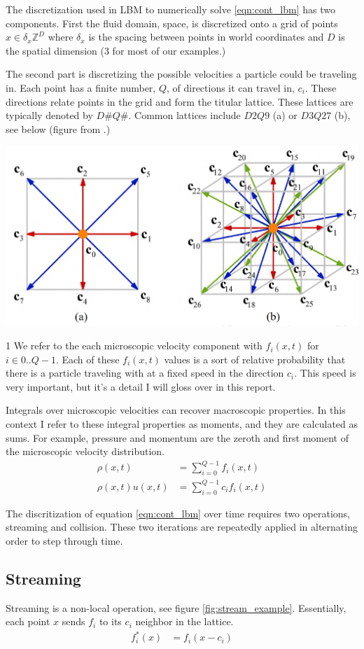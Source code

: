 The discretization used in LBM to numerically solve \ref{eqn:cont_lbm} 
has two components.
First the fluid domain, space, is 
discretized onto a
grid of points $x \in \delta_x \mathbb{Z}^D$
where $\delta_x$ is the spacing between points in world coordinates
and $D$ is the spatial dimension ($3$ for most of our examples.)

The second part is discretizing the possible velocities a particle 
could be traveling in. 
Each point has a finite number, $Q$, of directions it can travel in, $c_i$.
These directions relate points in the grid and form the titular lattice.
These lattices are typically denoted by $D\#Q\#$.
Common lattices include $D2Q9$ (a) or $D3Q27$ (b), see below (figure from \cite{Li2020}.)
\begin{center}
\includegraphics[width=0.6\linewidth]{lattice_figure.png}
\end{center}

1 We refer to the each microscopic velocity component with 
$f_i(x, t)$ for $i \in 0..Q - 1$.
Each of these $f_i(x, t)$ values is a sort of relative 
probability that there is a particle traveling with at a 
fixed speed in the direction $c_i$.
This speed is very important, but it's a detail 
I will gloss over in this report.

Integrals over microscopic velocities can 
recover macroscopic properties.
In this context I refer to these integral properties as moments, 
and they are calculated as sums. 
For example, pressure and momentum are the zeroth and first moment 
of the microscopic velocity distribution.
\begin{align}
  \rho(x, t) &= \sum_{i = 0}^{Q - 1} f_i(x, t) \\
  \rho(x,t)u(x,t) &= \sum_{i = 0}^{Q - 1}c_i f_i(x, t)
\end{align}

The discritization of equation \ref{eqn:cont_lbm} over time
requires two operations, streaming and collision.
These two iterations are repeatedly applied in alternating
order to step through time.

\subsection{Streaming}
Streaming is a non-local operation, see figure \ref{fig:stream_example}. 
Essentially, each point $x$ sends $f_i$ 
to its $c_i$ neighbor in the lattice.
\begin{align*}
  f_i^{*}(x) &= f_i(x - c_i)
\end{align*}

